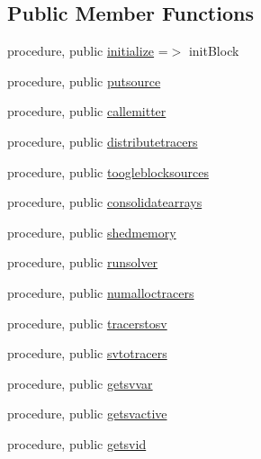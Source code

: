 \subsection*{Public Member Functions}
\begin{DoxyCompactItemize}
\item 
procedure, public \mbox{\hyperlink{structblocks__mod_1_1block__class_ad671745ca5dc3227ddb0ed1d9ff45268}{initialize}} =$>$ init\+Block
\item 
procedure, public \mbox{\hyperlink{structblocks__mod_1_1block__class_ac79980e841902691a06212dce50f6331}{putsource}}
\item 
procedure, public \mbox{\hyperlink{structblocks__mod_1_1block__class_ad1d0f1aca1323fad86177deb0b818a51}{callemitter}}
\item 
procedure, public \mbox{\hyperlink{structblocks__mod_1_1block__class_a00f8c114e84499356db3f8b633a6b3a3}{distributetracers}}
\item 
procedure, public \mbox{\hyperlink{structblocks__mod_1_1block__class_a73bd9f99f97d7fd882a3ade1103d27ae}{toogleblocksources}}
\item 
procedure, public \mbox{\hyperlink{structblocks__mod_1_1block__class_a68f5bb0cb32b5b51cffd66d472cc45f0}{consolidatearrays}}
\item 
procedure, public \mbox{\hyperlink{structblocks__mod_1_1block__class_a2e0c6452c90707a798ba55efaba43121}{shedmemory}}
\item 
procedure, public \mbox{\hyperlink{structblocks__mod_1_1block__class_abe738c65f3fecf013c3884275a3fe7e4}{runsolver}}
\item 
procedure, public \mbox{\hyperlink{structblocks__mod_1_1block__class_a7a3f2eb6823a683a6aaa2159b50ee990}{numalloctracers}}
\item 
procedure, public \mbox{\hyperlink{structblocks__mod_1_1block__class_a5a0ac8b8f2440af5e52a7c4bc59be470}{tracerstosv}}
\item 
procedure, public \mbox{\hyperlink{structblocks__mod_1_1block__class_a5f32bf4e17b571024c594cb4866513ee}{svtotracers}}
\item 
procedure, public \mbox{\hyperlink{structblocks__mod_1_1block__class_a16587b020185447a1ff1c398e23ddd5e}{getsvvar}}
\item 
procedure, public \mbox{\hyperlink{structblocks__mod_1_1block__class_ac487bb271919ea944d58ff2cb1b9899e}{getsvactive}}
\item 
procedure, public \mbox{\hyperlink{structblocks__mod_1_1block__class_ad6605f97a406b2f7e3c95b7ce4ca994d}{getsvid}}

\end{DoxyCompactItemize}
